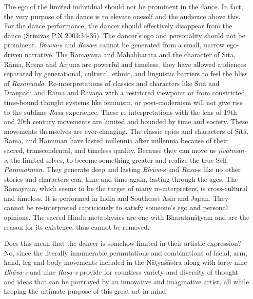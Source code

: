 The ego of the limited individual should not be prominent in the dance. In fact, the very purpose of the dance is to elevate oneself and the audience above this. For the dance performance, the dancer should effectively disappear from the dance (Srinivas P.N 2003:34-35). The dancer’s ego and personality should not be prominent. \textit{Bhava-s} and \textit{Rasa}-s cannot be generated from a small, narrow ego-driven narrative. The Rāmāyaṇa and Mahābhārata and the character of Sītā, Rāma, Kṛṣṇa and Arjuna are powerful and timeless, they have allowed audiences separated by generational, cultural, ethnic, and linguistic barriers to feel the bliss of \textit{Rasānanda}. Re-interpretations of classics and characters like Sītā and Draupadi and Rāma and Rāvaṇa with a restricted viewpoint or from constricted, time-bound thought systems like feminism, or post-modernism will not give rise to the sublime \textit{Rasa} experience. These re-interpretations with the lens of 19th and 20th century movements are limited and bounded by time and society. These movements themselves are ever-changing. The classic epics and characters of Sītā, Rāma, and Hanuman have lasted millennia after millennia because of their sacred, transcendental, and timeless quality. Because they can move us \textit{jīvātman-s}, the limited selves, to become something greater and realize the true Self – \textit{Paramātman}. They generate deep and lasting \textit{Bhāva}-s and \textit{Rasa}-s like no other stories and characters can, time and time again, lasting through the ages. The Rāmāyaṇa, which seems to be the target of many re-interpreters, is cross-cultural and timeless. It is performed in India and Southeast Asia and Japan. They cannot be re-interpreted capriciously to satisfy someone’s ego and personal opinions. The sacred Hindu metaphysics are one with Bharatanāṭyaṃ and are the reason for its existence, thus cannot be removed.

\vskip -2pt

Does this mean that the dancer is somehow limited in their artistic expression? No, since the literally innumerable permutations and combinations of facial, arm, hand, leg and body movements included in the Nāṭyaśāstra along with forty-nine \textit{Bhāva-s} and nine \textit{Rasa-s} provide for countless variety and diversity of thought and ideas that can be portrayed by an innovative and imaginative artist, all while keeping the ultimate purpose of this great art in mind. 


